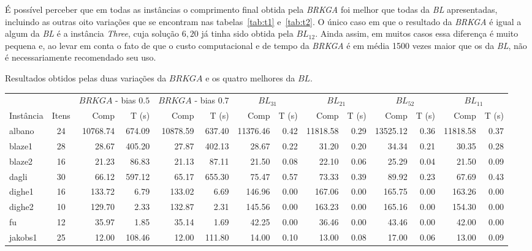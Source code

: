 \documentclass[12pt, openright, twoside, a4paper, english, brazilian]{USPSC-classe/USPSC}
\newcommand{\lgray}{\cellcolor{lightgray}}
\begin{document}
É possível perceber que em todas as instâncias o comprimento final obtida pela {\it BRKGA} foi melhor que todas da {\it BL} apresentadas, incluindo as outras oito variações que se encontram nas tabelas~\ref{tab:t1} e~\ref{tab:t2}. O único caso em que o resultado da {\it BRKGA} é igual a algum da {\it BL} é a instância {\it Three}, cuja solução $6,20$ já tinha sido obtida pela $BL_{12}$. Ainda assim, em muitos casos essa diferença é muito pequena e, ao levar em conta o fato de que o custo computacional e de tempo da {\it BRKGA} é em média 1500 vezes maior que os da {\it BL}, não é necessariamente recomendado seu uso.

\begin{adjustwidth}{-2.5 cm}{-2.5 cm}\centering\begin{threeparttable}[!htb]
\renewcommand{\arraystretch}{1.2}%
    \caption{Resultados obtidos pelas duas variações da $BRKGA$ e os quatro melhores da $BL$.}
    \scriptsize{
    \begin{tabular}{|l|c|rr|rr|rr|rr|rr|rr|}\hline
        \multicolumn{1}{|c|}{} & \multicolumn{1}{c|}{} &\multicolumn{2}{c|}{$BRKGA$ - bias $0.5$} &\multicolumn{2}{c|}{$BRKGA$ - bias $0.7$} &\multicolumn{2}{c|}{$BL_{31}$} &\multicolumn{2}{c|}{$BL_{21}$} &\multicolumn{2}{c|}{$BL_{52}$} &\multicolumn{2}{c|}{$BL_{11}$} \\
        Instância & Itens &Comp &T (s) &Comp &T (s) &Comp &T (s) &Comp &T (s) &Comp &T (s) &Comp &T (s) \\\hline
        albano &24 &\lgray10768.74 &674.09 &10878.59 &637.40 &11376.46 &0.42 &11818.58 &0.29 &13525.12 &0.36 &11818.58 &0.37 \\
        blaze1 &28 &28.67 &405.20 &\lgray27.87 &402.13 &28.67 &0.22 &31.20 &0.20 &34.34 &0.21 &30.35 &0.28 \\
        blaze2 &16 &21.23 &86.83 &\lgray21.13 &87.11 &21.50 &0.08 &22.10 &0.06 &25.29 &0.04 &21.50 &0.09 \\
        dagli &30 &66.12 &597.12 &\lgray65.17 &655.30 &75.47 &0.57 &73.33 &0.39 &89.92 &0.23 &67.69 &0.43 \\
        dighe1 &16 &133.72 &6.79 &\lgray133.02 &6.69 &146.96 &0.00 &167.06 &0.00 &165.75 &0.00 &163.26 &0.00 \\
        dighe2 &10 &\lgray129.70 &2.33 &132.87 &2.31 &145.56 &0.00 &163.23 &0.00 &165.16 &0.00 &154.30 &0.00 \\
        fu &12 &35.97 &1.85 &\lgray35.14 &1.69 &42.25 &0.00 &36.46 &0.00 &43.46 &0.00 &42.00 &0.00 \\
        jakobs1 &25 &\lgray12.00 &108.46 &\lgray12.00 &111.80 &14.00 &0.10 &13.00 &0.08 &17.00 &0.06 &13.00 &0.09 \\

\end{tabular}}
\end{threeparttable}
\end{adjustwidth}
\end{document}

